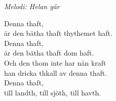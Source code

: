 {\footnotesize\textit{Melodi: Helan går}}\par
\vspace{10pt}
Denna thaft,\\
är den bätha thaft thythemet haft.\\
Denna thaft,\\
är den bätha thaft dom haft.\\
Och den thom inte har nån kraft\\
han dricka thkall av denna thaft.\\
Denna thaft,\\
till landth, till sjöth, till havth.
